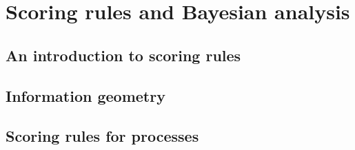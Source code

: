 \part{Scoring rules and Bayesian analysis}

\chapter{An introduction to scoring rules\label{sec:scoring_rules}}


\chapter{Information geometry\label{sec:embeddings}}


\chapter{Scoring rules for processes\label{sec:scoring_processes}}
